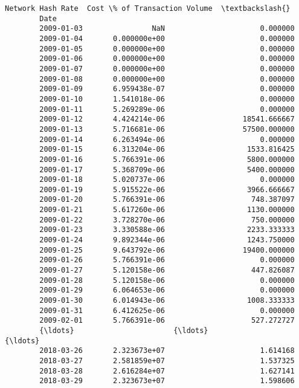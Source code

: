 \documentclass[11pt]{article}
\begin{document}
\begin{Verbatim}[commandchars=\\\{\}]
                    Network Hash Rate  Cost \% of Transaction Volume  \textbackslash{}
        Date                                                          
        2009-01-03                NaN                      0.000000   
        2009-01-04       0.000000e+00                      0.000000   
        2009-01-05       0.000000e+00                      0.000000   
        2009-01-06       0.000000e+00                      0.000000   
        2009-01-07       0.000000e+00                      0.000000   
        2009-01-08       0.000000e+00                      0.000000   
        2009-01-09       6.959438e-07                      0.000000   
        2009-01-10       1.541018e-06                      0.000000   
        2009-01-11       5.269289e-06                      0.000000   
        2009-01-12       4.424214e-06                  18541.666667   
        2009-01-13       5.716681e-06                  57500.000000   
        2009-01-14       6.263494e-06                      0.000000   
        2009-01-15       6.313204e-06                   1533.816425   
        2009-01-16       5.766391e-06                   5800.000000   
        2009-01-17       5.368709e-06                   5400.000000   
        2009-01-18       5.020737e-06                      0.000000   
        2009-01-19       5.915522e-06                   3966.666667   
        2009-01-20       5.766391e-06                    748.387097   
        2009-01-21       5.617260e-06                   1130.000000   
        2009-01-22       3.728270e-06                    750.000000   
        2009-01-23       3.330588e-06                   2233.333333   
        2009-01-24       9.892344e-06                   1243.750000   
        2009-01-25       9.643792e-06                  19400.000000   
        2009-01-26       5.766391e-06                      0.000000   
        2009-01-27       5.120158e-06                    447.826087   
        2009-01-28       5.120158e-06                      0.000000   
        2009-01-29       6.064653e-06                      0.000000   
        2009-01-30       6.014943e-06                   1008.333333   
        2009-01-31       6.412625e-06                      0.000000   
        2009-02-01       5.766391e-06                    527.272727   
        {\ldots}                       {\ldots}                           {\ldots}   
        2018-03-26       2.323673e+07                      1.614168   
        2018-03-27       2.581859e+07                      1.537325   
        2018-03-28       2.616284e+07                      1.627141   
        2018-03-29       2.323673e+07                      1.598606   

\end{Verbatim}
\end{document}
